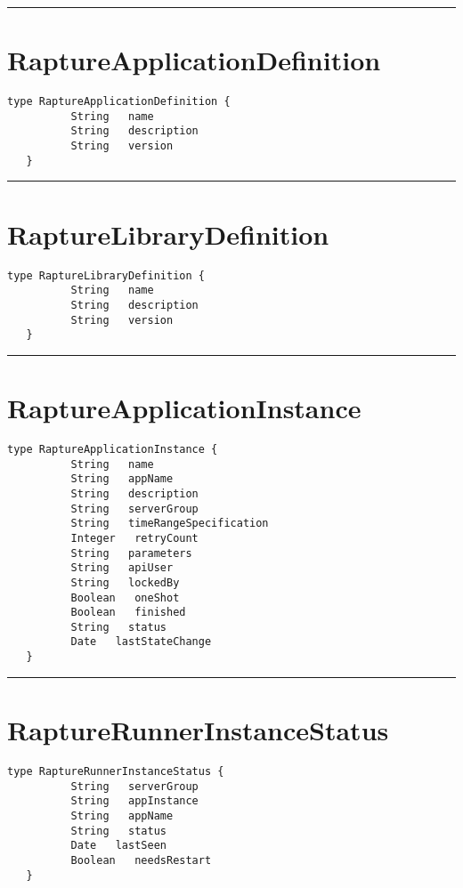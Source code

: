 \rule{12cm}{2pt}
\section{RaptureApplicationDefinition}
\label{type:RaptureApplicationDefinition}

\begin{lstlisting}[style=nonumbers]
   type RaptureApplicationDefinition {
          String   name
          String   description
          String   version
   }
\end{lstlisting}

\rule{12cm}{2pt}
\section{RaptureLibraryDefinition}
\label{type:RaptureLibraryDefinition}

\begin{lstlisting}[style=nonumbers]
   type RaptureLibraryDefinition {
          String   name
          String   description
          String   version
   }
\end{lstlisting}

\rule{12cm}{2pt}
\section{RaptureApplicationInstance}
\label{type:RaptureApplicationInstance}

\begin{lstlisting}[style=nonumbers]
   type RaptureApplicationInstance {
          String   name
          String   appName
          String   description
          String   serverGroup
          String   timeRangeSpecification
          Integer   retryCount
          String   parameters
          String   apiUser
          String   lockedBy
          Boolean   oneShot
          Boolean   finished
          String   status
          Date   lastStateChange
   }
\end{lstlisting}

\rule{12cm}{2pt}
\section{RaptureRunnerInstanceStatus}
\label{type:RaptureRunnerInstanceStatus}

\begin{lstlisting}[style=nonumbers]
   type RaptureRunnerInstanceStatus {
          String   serverGroup
          String   appInstance
          String   appName
          String   status
          Date   lastSeen
          Boolean   needsRestart
   }
\end{lstlisting}


